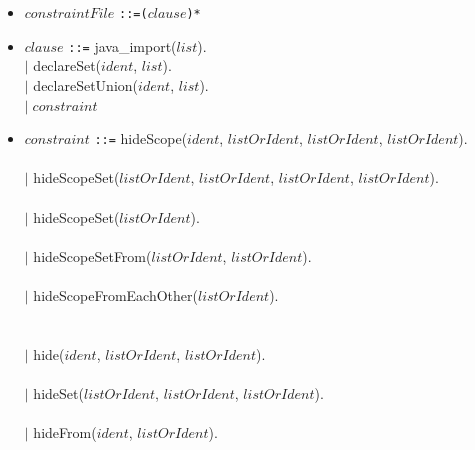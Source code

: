 \documentclass[]{article}
\begin{document}
\begin{itemize}
	\item $constraintFile$ \verb|::=(|$clause$\verb|)*| 
	
	\item \begin{tabbing}
		$clause$ \verb|::|\=\verb|=| java\_import($list$).\\		
		\>$|$ declareSet($ident$, $list$).\\
		\>$|$ declareSetUnion($ident$, $list$).\\
		\>$|\; constraint$
	\end{tabbing}
	\item \begin{tabbing}
		$constraint$ \verb|::|\=\verb|=| hideScope($ident$, $listOrIdent$, $listOrIdent$, $listOrIdent$).\\	
		\>\color{light-gray}{hideScope(scope, facades, interlopers, friends)}\\
		
		\>$|$ hideScopeSet($listOrIdent$, $listOrIdent$, $listOrIdent$, $listOrIdent$).\\
		\>\color{light-gray}{hideScopeSet(scopeSet, facades, interlopers, friends)}\\
		
		\>$|$ hideScopeSet($listOrIdent$).\\
		\>\color{light-gray}{hideScopeSet(scopeSet)}\\
			
		\>$|$ hideScopeSetFrom($listOrIdent$, $listOrIdent$).\\
		\>\color{light-gray}{hideScopeSetFrom(scopeSet, interlopers)}\\
			
		\>$|$ hideScopeFromEachOther($listOrIdent$).\\
		\>\color{light-gray}{hideScopeFromEachOther(scopeSet)}\\
		\\
		\>$|$ hide($ident$, $listOrIdent$, $listOrIdent$).\\
		\>\color{light-gray}{hide(element, interlopers, friends)}\\
		
		\>$|$ hideSet($listOrIdent$, $listOrIdent$, $listOrIdent$).\\	
		\>\color{light-gray}{hideSet(elementSet, interlopers, friends)}\\
		
		\>$|$ hideFrom($ident$, $listOrIdent$).\\	
		\>\color{light-gray}{hideFrom(element, interlopers)}\\
				

\end{tabbing}
\end{itemize}
\end{document}
